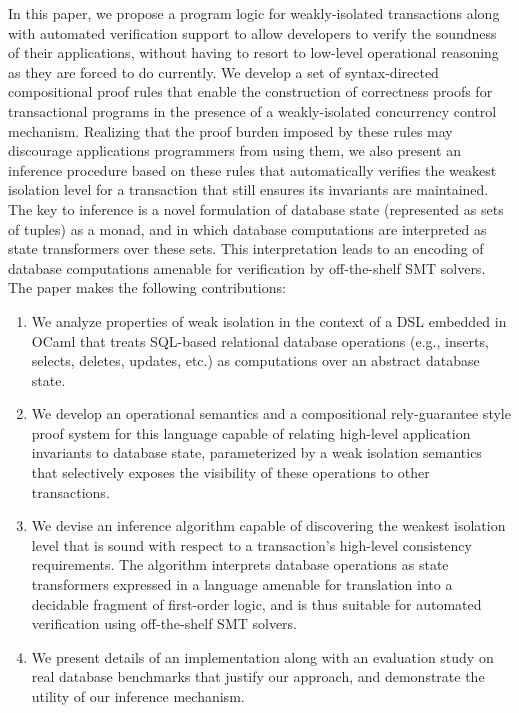 In this paper, we propose a program logic for weakly-isolated
transactions along with automated verification support to allow
developers to verify the soundness of their applications, without
having to resort to low-level operational reasoning as they are forced
to do currently.  We develop a set of syntax-directed compositional
proof rules that enable the construction of correctness proofs for
transactional programs in the presence of a weakly-isolated
concurrency control mechanism.  Realizing that the proof burden
imposed by these rules may discourage applications programmers from
using them, we also present an inference procedure based on these
rules that automatically verifies the weakest isolation level for a
transaction that still ensures its invariants are maintained.  The key
to inference is a novel formulation of database state (represented as
sets of tuples) as a monad, and in which database computations are
interpreted as state transformers over these sets.  This
interpretation leads to an encoding of database computations amenable
for verification by off-the-shelf SMT solvers.  The paper makes the
following contributions:
\begin{enumerate}
  \item We analyze properties of weak isolation in the context of a
    DSL embedded in OCaml that treats SQL-based relational database
    operations (e.g., inserts, selects, deletes, updates, etc.) as
    computations over an abstract database state.
  \item We develop an operational semantics and a compositional
    rely-guarantee style proof system for this language capable of
    relating high-level application invariants to database state,
    parameterized by a weak isolation semantics that selectively
    exposes the visibility of these operations to other transactions.
  \item We devise an inference algorithm capable of discovering the
    weakest isolation level that is sound with respect to a
    transaction's high-level consistency requirements. The algorithm
    interprets database operations as state transformers expressed in
    a language amenable for translation into a decidable fragment of
    first-order logic, and is thus suitable for automated verification
    using off-the-shelf SMT solvers.
  \item We present details of an implementation along with an
    evaluation study on real database benchmarks that justify our
    approach, and demonstrate the utility of our inference mechanism.
\end{enumerate}
